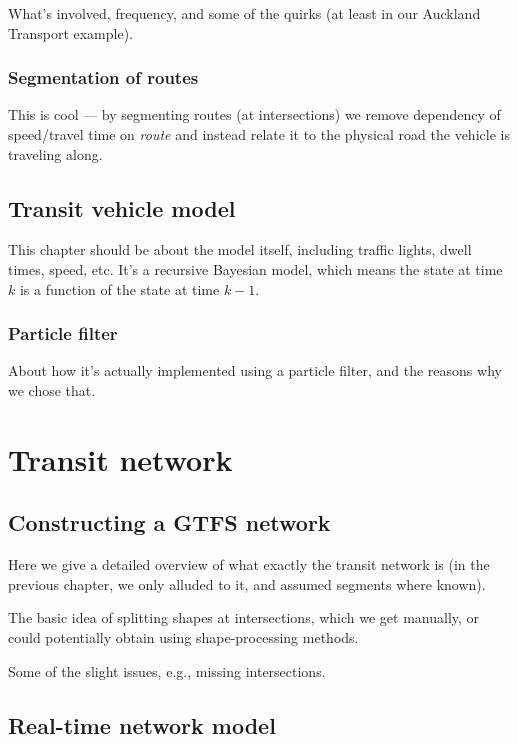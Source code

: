\documentclass[english]{MastersDoctoralThesis}\usepackage[]{graphicx}\usepackage[]{color}
\begin{document}
What's involved, frequency, and some of the
quirks (at least in our Auckland Transport example).


\section{Segmentation of routes}

This is cool --- by segmenting routes
(at intersections) we remove dependency of
speed/travel time on \emph{route} and instead
relate it to the physical road the vehicle is traveling along.



\chapter{Transit vehicle model}
\label{cha:vehiclemodel}

This chapter should be about the model itself,
including traffic lights, dwell times, speed, etc.
It's a recursive Bayesian model,
which means the state at time $k$ is a function
of the state at time $k-1$.

\section{Particle filter}

About how it's actually implemented using a particle filter,
and the reasons why we chose that.


\part{Transit network}



\chapter{Constructing a GTFS network}

Here we give a detailed overview of what exactly the
transit network is
(in the previous chapter, we only alluded to it,
and assumed segments where known).

The basic idea of splitting shapes at intersections,
which we get manually, or could potentially
obtain using shape-processing methods.

Some of the slight issues, e.g., missing intersections.



\chapter{Real-time network model}
\end{document}
